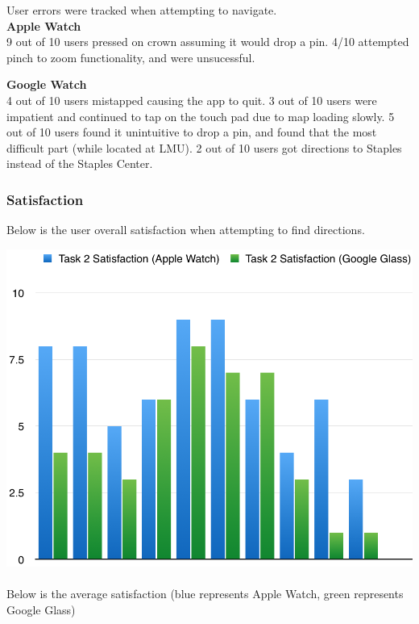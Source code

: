 \documentclass[paper=a4, fontsize=11pt]{scrartcl}	%
\numberwithin{equation}{section}															%
\numberwithin{figure}{section}																%
\numberwithin{table}{section}																%
\begin{document}
User errors were tracked when attempting to navigate.\\

\textbf{Apple Watch} \\
9 out of 10 users pressed on crown assuming it would drop a pin. 4/10 attempted pinch to zoom functionality, and were unsucessful.

\textbf{Google Watch}\\
4 out of 10 users mistapped causing the app to quit. 3 out of 10 users were impatient and continued to tap on the touch pad due to map loading slowly. 5 out of 10 users found it unintuitive to drop a pin, and found that the most difficult part (while located at LMU). 2 out of 10 users got directions to Staples instead of the Staples Center.


\subsubsection{Satisfaction}
Below is the user overall satisfaction when attempting to find directions.

\includegraphics[scale=0.8]{task2sat}\\ \\

Below is the average satisfaction (blue represents Apple Watch, green represents Google Glass)\\ \\
\end{document}
